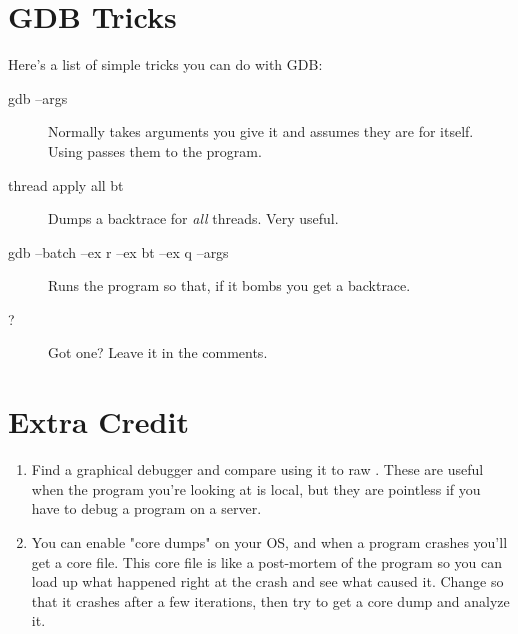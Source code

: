 \section{GDB Tricks}

Here's a list of simple tricks you can do with GDB:

\begin{description}
\item[gdb --args] Normally  takes arguments you give it
    and assumes they are for itself.  Using  passes them to 
    the program.
\item[thread apply all bt] Dumps a backtrace for \emph{all} threads.  Very useful.
\item[gdb --batch --ex r --ex bt --ex q --args] Runs the program so that, if it
    bombs you get a backtrace.
\item[?] Got one? Leave it in the comments.
\end{description}


\section{Extra Credit}

\begin{enumerate}
\item Find a graphical debugger and compare using it to raw .
    These are useful when the program you're looking at is local, but they
    are pointless if you have to debug a program on a server.
\item You can enable "core dumps" on your OS, and when a program crashes
    you'll get a core file.  This core file is like a post-mortem of
    the program so you can load up what happened right at the crash
    and see what caused it.  Change  so that it crashes
    after a few iterations, then try to get a core dump and analyze it.
\end{enumerate}
